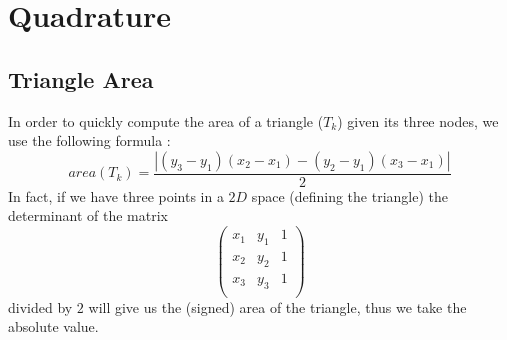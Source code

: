 \documentclass[a4paper]{report}
\begin{document}
\section{Quadrature}
\subsection{Triangle Area}
In order to quickly compute the area of a triangle ($T_k$) given its three nodes, we use the following formula :
\[
area(T_k)=\frac{| (y_3-y_1)(x_2-x_1)-(y_2-y_1)(x_3-x_1) |}{2}
\]
In fact, if we have three points in a $2D$ space (defining the triangle) the determinant of the matrix
\[
\left(
\begin{matrix}
x_1 & y_1 & 1\\
x_2 & y_2 & 1\\
x_3 & y_3 & 1\\
\end{matrix}
\right)
\]
divided by $2$ will give us the (signed) area of the triangle, thus we take the absolute value.
\end{document}
